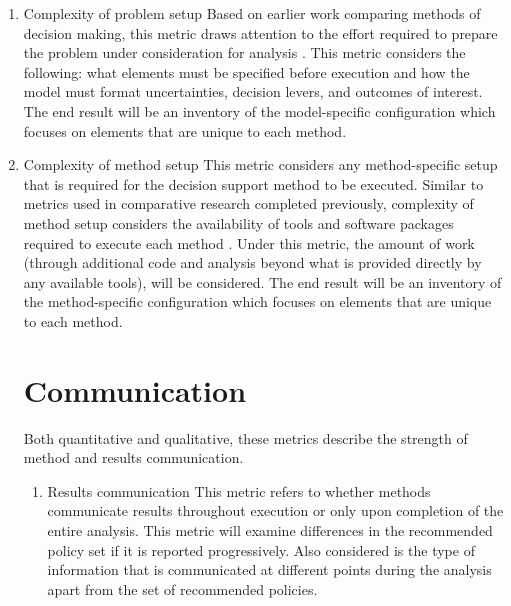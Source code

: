\begin{enumerate}[leftmargin=*,align=left,label=\textbf{Comparison \arabic* :}]
    \item Complexity of problem setup \newline
          Based on earlier work comparing methods of decision making, this metric draws attention to the effort required to prepare the problem under consideration for analysis \citep{Kwakkel2016Compare,Roach2015}. This metric considers the following: what elements must be specified before execution and how the model must format uncertainties, decision levers, and outcomes of interest. The end result will be an inventory of the model-specific configuration which focuses on elements that are unique to each method. 
    \item Complexity of method setup \newline
          This metric considers any method-specific setup that is required for the decision support method to be executed. Similar to metrics used in comparative research completed previously, complexity of method setup considers the availability of tools and software packages required to execute each method \citep{Gersonius2016, Kwakkel2016Compare}. Under this metric, the amount of work (through additional code and analysis beyond what is provided directly by any available tools), will be considered. The end result will be an inventory of the method-specific configuration which focuses on elements that are unique to each method.

\section{Communication}\label{compare-communication}
Both quantitative and qualitative, these metrics describe the strength of method and results communication. 

\begin{enumerate}[resume,leftmargin=*,align=left,label=\textbf{Comparison \arabic* :}]
    \item Results communication \newline
          This metric refers to whether methods communicate results throughout execution or only upon completion of the entire analysis. This metric will examine differences in the recommended policy set if it is reported progressively. Also considered is the type of information that is communicated at different points during the analysis apart from the set of recommended policies. 
          

\end{enumerate}
\end{enumerate}
